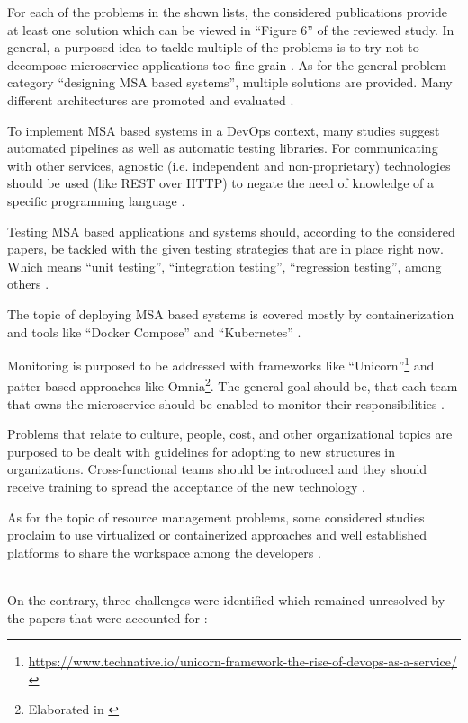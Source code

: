 For each of the problems in the shown lists, the considered publications
provide at least one solution which can be viewed in ``Figure 6''
of the reviewed study. In general, a purposed idea to tackle multiple
of the problems is to try not to decompose microservice applications
too fine-grain \cite{waseem:SMSMSADevOps}. As for the general problem
category ``designing MSA based systems'', multiple solutions are provided.
Many different architectures are promoted and evaluated \cite{waseem:SMSMSADevOps}.

To implement MSA based systems in a DevOps context, many studies suggest
automated pipelines as well as automatic testing libraries. For communicating
with other services, agnostic (i.e. independent and non-proprietary)
technologies should be used (like REST over HTTP)
to negate the need of knowledge of a specific programming language 
\cite{waseem:SMSMSADevOps}.

Testing MSA based applications and systems should, according to the considered
papers, be tackled with the given testing strategies that are in place
right now. Which means ``unit testing'', ``integration testing'',
``regression testing'', among others \cite{waseem:SMSMSADevOps}.

The topic of deploying MSA based systems is covered mostly by containerization
and tools like ``Docker Compose'' and ``Kubernetes'' \cite{waseem:SMSMSADevOps}.

Monitoring is purposed to be addressed with frameworks like 
``Unicorn''\footnote{\url{https://www.technative.io/unicorn-framework-the-rise-of-devops-as-a-service/}}
and patter-based approaches like Omnia\footnote{Elaborated in \cite{miglerina:Omnia}}.
The general goal should be, that each team that owns the microservice should be enabled
to monitor their responsibilities \cite{waseem:SMSMSADevOps}.

Problems that relate to culture, people, cost, and other organizational
topics are purposed to be dealt with guidelines for adopting to
new structures in organizations. Cross-functional teams should be introduced
and they should receive training to spread the acceptance of the
new technology \cite{waseem:SMSMSADevOps}.

As for the topic of resource management problems, some considered
studies proclaim to use virtualized or containerized approaches
and well established platforms to share the workspace among
the developers \cite{waseem:SMSMSADevOps}.

~\\
On the contrary, three challenges were identified which
remained unresolved by the papers that were accounted for \cite{waseem:SMSMSADevOps}:

